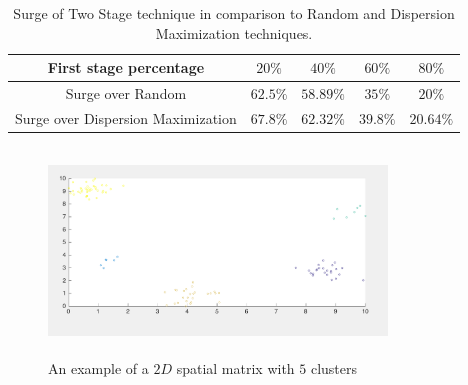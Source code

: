 \documentclass{acm_proc_article-sp}
\begin{document}
\begin{table}{}
\centering
\begin{tabulary}{0.5\textwidth}{|C|C|C|C|C|}
\hline 
 First stage percentage & $20\%$ & $40\%$  & $60\%$  & $80\%$  \\ \hline
Surge over Random   & $62.5\%$ & $58.89\%$  & $35\%$  & $20\%$  \\ \hline
Surge over Dispersion Maximization   & $67.8\%$ & $62.32\%$  & $39.8\%$  & $20.64\%$ \\ \hline
\end{tabulary}  
\caption{Surge of Two Stage technique in comparison to Random and Dispersion Maximization techniques.}
\label{table:clusteredSurge}
\end{table}





 
\begin{figure}[!h]
\centering
   \includegraphics[width=9cm ,height=5.5cm]{figuresPng/clust.png}
   \caption{An example of a $2D$ spatial matrix with $5$ clusters }\label{fig: clust}
\end{figure}
\end{document}
